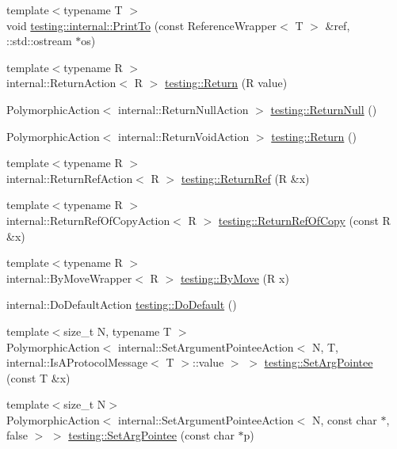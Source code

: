 \begin{DoxyCompactItemize}
\item 
{\footnotesize template$<$typename T $>$ }\\void \hyperlink{namespacetesting_1_1internal_a8fd10cc30084c36a89c74868c8bd53f8}{testing\+::internal\+::\+Print\+To} (const Reference\+Wrapper$<$ T $>$ \&ref, \+::std\+::ostream $\ast$os)
\item 
{\footnotesize template$<$typename R $>$ }\\internal\+::\+Return\+Action$<$ R $>$ \hyperlink{namespacetesting_af6d1c13e9376c77671e37545cd84359c}{testing\+::\+Return} (R value)
\item 
Polymorphic\+Action$<$ internal\+::\+Return\+Null\+Action $>$ \hyperlink{namespacetesting_aa0331596e269114da101f810d3a1b88b}{testing\+::\+Return\+Null} ()
\item 
Polymorphic\+Action$<$ internal\+::\+Return\+Void\+Action $>$ \hyperlink{namespacetesting_a8da8e53d2e7bc4e3c531f7435ad04823}{testing\+::\+Return} ()
\item 
{\footnotesize template$<$typename R $>$ }\\internal\+::\+Return\+Ref\+Action$<$ R $>$ \hyperlink{namespacetesting_a18eda8fe9c89ee856c199a2e04ca1641}{testing\+::\+Return\+Ref} (R \&x)
\item 
{\footnotesize template$<$typename R $>$ }\\internal\+::\+Return\+Ref\+Of\+Copy\+Action$<$ R $>$ \hyperlink{namespacetesting_ac1b75444c89371dc25ebcfcc48336201}{testing\+::\+Return\+Ref\+Of\+Copy} (const R \&x)
\item 
{\footnotesize template$<$typename R $>$ }\\internal\+::\+By\+Move\+Wrapper$<$ R $>$ \hyperlink{namespacetesting_acaa432211a3aec62e3d0f24b47bd2dae}{testing\+::\+By\+Move} (R x)
\item 
internal\+::\+Do\+Default\+Action \hyperlink{namespacetesting_ae041df61ff61ccb9753ba15b4309e1a6}{testing\+::\+Do\+Default} ()
\item 
{\footnotesize template$<$size\+\_\+t N, typename T $>$ }\\Polymorphic\+Action$<$ internal\+::\+Set\+Argument\+Pointee\+Action$<$ N, T, internal\+::\+Is\+A\+Protocol\+Message$<$ T $>$\+::value $>$ $>$ \hyperlink{namespacetesting_a5740a5033b88c37666fcd09a269d123f}{testing\+::\+Set\+Arg\+Pointee} (const T \&x)
\item 
{\footnotesize template$<$size\+\_\+t N$>$ }\\Polymorphic\+Action$<$ internal\+::\+Set\+Argument\+Pointee\+Action$<$ N, const char $\ast$, false $>$ $>$ \hyperlink{namespacetesting_a4a190fd2d02fb7cd79c5b3df3f80b647}{testing\+::\+Set\+Arg\+Pointee} (const char $\ast$p)

\end{DoxyCompactItemize}
